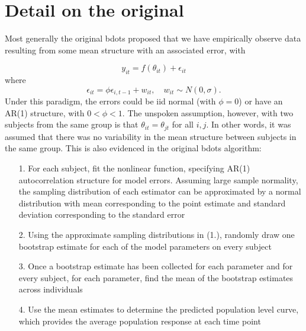 \documentclass{article}
\begin{document}
\section{Detail on the original}

Most generally the original bdots proposed that we have empirically observe data resulting from some mean structure with an associated error, with 

\begin{equation}
y_{it} = f(\theta_{it}) + \epsilon_{it}
\end{equation}
where 
\begin{equation}
\epsilon_{it} = \phi \epsilon_{i, t-1} + w_{it}, \quad w_{it} \sim N(0, \sigma).
\end{equation}
Under this paradigm, the errors could be iid normal (with $\phi = 0$) or have an AR(1) structure, with $0 < \phi < 1$. The unspoken assumption, however, with two subjects from the same group is that $\theta_{it} = \theta_{jt}$ for all $i, j$. In other words, it was assumed that there was no variability in the mean structure between subjects in the same group. This is also evidenced in the original bdots algorithm: 

\begin{singlespace}
\begin{enumerate}
\vspace{-3mm}
\item[1.] For each subject, fit the nonlinear function, specifying AR(1) autocorrelation structure for model errors. Assuming large sample normality, the sampling distribution of each estimator can be approximated by a normal distribution with mean corresponding to the point estimate and standard deviation corresponding to the standard error

\item[2.] Using the approximate sampling distributions in (1.), randomly draw one bootstrap estimate for each of the model parameters on every subject

\item[3.] Once a bootstrap estimate has been collected for each parameter and for every subject, for each parameter, find the mean of the bootstrap estimates across individuals

\item[4.] Use the mean estimates to determine the predicted population level curve, which provides the average population response at each time point
\end{enumerate}
\end{singlespace}
\end{document}
